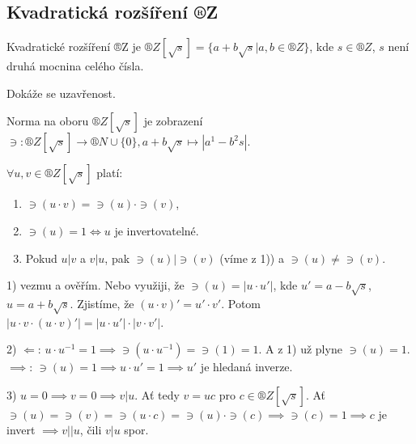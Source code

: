 \documentclass[12pt]{article}                   %
\begin{document}
    \subsection{Kvadratická rozšíření ®Z}
        \begin{definice}
            Kvadratické rozšíření ®Z je $®Z[\sqrt{s}] = \{a + b\sqrt{s}|a, b \in ®Z\}$, kde $s \in ®Z$, $s$ není druhá mocnina celého čísla.
            \begin{dukazin}[Tvar $®Z\[sqrt{s}\]$]
                Dokáže se uzavřenost.
            \end{dukazin}
        \end{definice}

        \begin{definice}
            Norma na oboru $®Z[\sqrt{s}]$ je zobrazení $\ni : ®Z[\sqrt{s}] \rightarrow ®N \cup \{0\}, a+b\sqrt{s} \mapsto |a^1 - b^2s|$.
        \end{definice}

        \begin{tvrzeni}
            $\forall u, v \in ®Z[\sqrt{s}]$ platí:
            
            \begin{enumerate}
                \item $\ni(u·v) = \ni(u)·\ni(v)$,
                \item $\ni(u) = 1 \Leftrightarrow u$ je invertovatelné.
                \item Pokud $u|v$ a $v|u$, pak $\ni(u)|\ni(v)$ (víme z 1)) a $\ni(u)≠\ni(v)$.
            \end{enumerate}

            \begin{dukazin}
                1) vezmu a ověřím. Nebo využiji, že $\ni(u) = |u·u'|$, kde $u' = a - b\sqrt{s}$, $u = a + b\sqrt{s}$. Zjistíme, že $(u·v)' = u'·v'$. Potom $|u·v·(u·v)'| = |u·u'|·|v·v'|$.

                2) $\Leftarrow$: $u·u^{-1} = 1 \implies \ni(u·u^{-1}) = \ni(1) = 1$. A z 1) už plyne $\ni(u) = 1$. $\implies$: $\ni(u) = 1 \implies u·u' = 1 \implies u'$ je hledaná inverze.

                3) $u = 0 \implies v = 0 \implies v|u$. Ať tedy $v=uc$ pro $c \in ®Z[\sqrt{s}]$. Ať $\ni(u) = \ni(v) = \ni(u·c) = \ni(u)·\ni(c) \implies \ni(c) = 1 \implies c$ je invert $\implies v||u$, čili $v|u$ spor.
            \end{dukazin}
        \end{tvrzeni}
\end{document}
